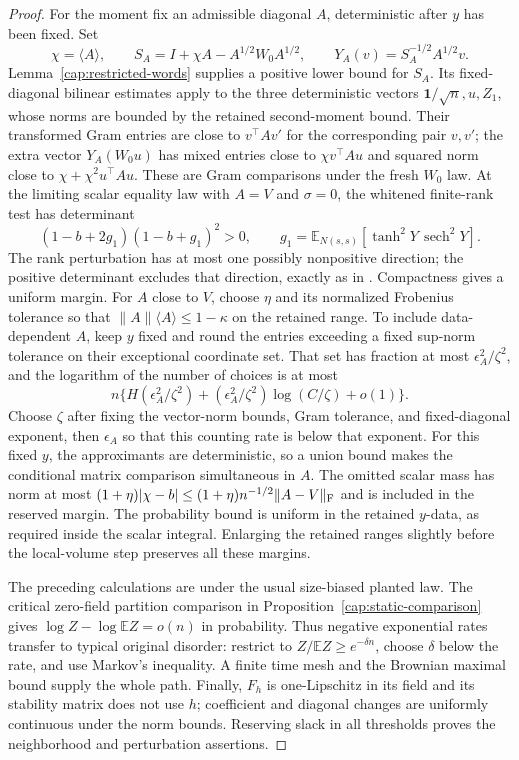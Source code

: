\begin{proof}
For the moment fix an admissible diagonal \(A\), deterministic after \(y\)
has been fixed. Set
\[
 \chi=\langle A\rangle,\qquad
 S_A=I+\chi A-A^{1/2}W_0A^{1/2},\qquad
 Y_A(v)=S_A^{-1/2}A^{1/2}v .
\]
Lemma~\ref{cap:restricted-words} supplies a positive lower bound for \(S_A\).
Its fixed-diagonal bilinear estimates apply to the three deterministic
vectors \(\mathbf1/\sqrt n,u,Z_1\), whose norms are bounded by the retained
second-moment bound. Their transformed Gram entries are close to
\(v^\top Av'\) for the corresponding pair \(v,v'\); the extra vector \(Y_A(W_0u)\) has mixed entries close to
\(\chi v^\top Au\) and squared norm close to
\(\chi+\chi^2u^\top Au\). These are Gram comparisons under the fresh
\(W_0\) law. At the limiting scalar equality law with \(A=V\) and
\(\sigma=0\), the whitened finite-rank test has
determinant
\[
 (1-b+2g_1)(1-b+g_1)^2>0,
 \qquad
 g_1=\mathbb E_{N(s,s)}[\tanh^2Y\,\operatorname{sech}^2Y].
\]
The rank perturbation has at most one possibly nonpositive direction; the
positive determinant excludes that direction, exactly as in
\cite[Lemma~5.5]{AcceptedGap}. Compactness gives a uniform margin. For $A$
close to $V$, choose $\eta$ and its normalized Frobenius tolerance so that
$\|A\|\langle A\rangle\le1-\kappa$ on the retained range. To include
data-dependent \(A\), keep \(y\) fixed and round the entries exceeding a fixed sup-norm tolerance on
their exceptional coordinate set. That set has fraction at most
$\epsilon_A^2/\zeta^2$, and the logarithm of the number of choices is at most
\[
 n\{H(\epsilon_A^2/\zeta^2)
             +(\epsilon_A^2/\zeta^2)\log(C/\zeta)+o(1)\}.
\]
Choose \(\zeta\) after fixing the vector-norm bounds, Gram tolerance, and
fixed-diagonal exponent, then \(\epsilon_A\) so that this counting rate is
below that exponent. For this fixed \(y\), the approximants are deterministic,
so a union bound makes the conditional matrix comparison simultaneous in
\(A\). The omitted scalar mass has norm at most
\((1+\eta)|\chi-b|\le(1+\eta)n^{-1/2}\|A-V\|_{\rm F}\) and is included in
the reserved margin. The probability bound is uniform in the retained
\(y\)-data, as required inside the scalar integral. Enlarging the retained ranges slightly before the
local-volume step preserves all these margins.

The preceding calculations are under the usual size-biased planted law. The
critical zero-field partition comparison in
Proposition~\ref{cap:static-comparison} gives $\log Z-\log\mathbb EZ=o(n)$ in
probability. Thus negative exponential rates transfer to typical original
disorder: restrict to $Z/\mathbb EZ\ge e^{-\delta n}$, choose $\delta$ below
the rate, and use Markov's inequality. A finite time mesh and the Brownian
maximal bound supply the whole path. Finally, $F_h$ is one-Lipschitz in its
field and its stability matrix does not use $h$; coefficient and diagonal
changes are uniformly continuous under the norm bounds. Reserving slack in all
thresholds proves the neighborhood and perturbation assertions. \end{proof}

